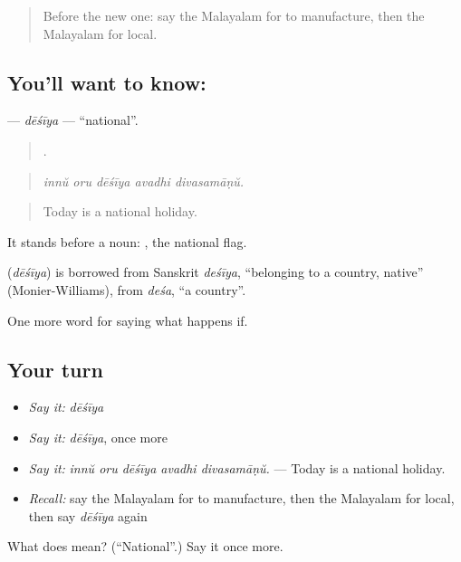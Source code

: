 \begin{quote}
Before the new one: say the Malayalam for to manufacture, then the Malayalam for local.
\end{quote}

\subsection*{You'll want to know: }
\textbf{} — \emph{dēśīya} — \textquotedblleft{}national\textquotedblright{}.

\begin{quote}
    .
\end{quote}

\begin{quote}
\emph{innŭ oru dēśīya avadhi divasamāṇŭ.}
\end{quote}

\begin{quote}
Today is a national holiday.
\end{quote}

It stands before a noun:  , the national flag.

\begin{cousinweb}
\textbf{} (\emph{dēśīya}) is borrowed from Sanskrit \emph{deśīya}, \textquotedblleft{}belonging to a country, native\textquotedblright{} (Monier-Williams), from \emph{deśa}, \textquotedblleft{}a country\textquotedblright{}.
\end{cousinweb}

\begin{grammarlens}[title={What you've built}]
One more word for saying what happens if.
\end{grammarlens}

\subsection*{Your turn}
\begin{itemize}
\raggedright
  \item \emph{Say it:} \emph{dēśīya}
  \item \emph{Say it:} \emph{dēśīya}, once more
  \item \emph{Say it:} \emph{innŭ oru dēśīya avadhi divasamāṇŭ.} — Today is a national holiday.
  \item \emph{Recall:} say the Malayalam for to manufacture, then the Malayalam for local, then say \emph{dēśīya} again
\end{itemize}

\begin{tcolorbox}[breakable,colback=teal!4,colframe=teal!35!black,title={Before you move on}]
What does  mean? (\textquotedblleft{}National\textquotedblright{}.) Say it once more.
\end{tcolorbox}
